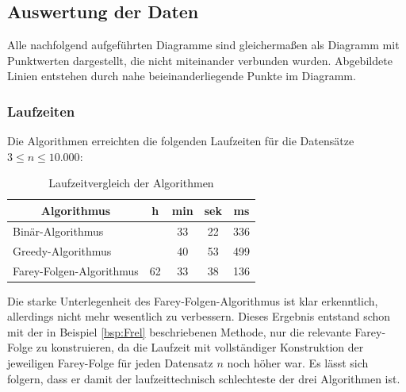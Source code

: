 \subsection{Auswertung der Daten}
Alle nachfolgend aufgeführten Diagramme sind gleichermaßen als Diagramm mit Punktwerten dargestellt, die nicht miteinander verbunden wurden. Abgebildete Linien entstehen durch nahe beieinanderliegende Punkte im Diagramm.


\subsubsection{Laufzeiten}
Die Algorithmen erreichten die folgenden Laufzeiten für die Datensätze $3 \leq n \leq 10.000$:\\
\begin{table}[H]
	\centering
	\begin{tabular}{|l | c c c c|}
		\hline
		\multicolumn{1}{|c|}{\textbf{Algorithmus}} & h & min & sek & ms \\ \hline
		Binär-Algorithmus & & 33 & 22 & 336 \\ \hline
		Greedy-Algorithmus & & 40 &  53 & 499 \\ \hline
		Farey-Folgen-Algorithmus & 62 & 33 & 38 & 136 \\ \hline
	\end{tabular}
	\caption{Laufzeitvergleich der Algorithmen}
	\label{table:LaufzeitVgl}
\end{table}
Die starke Unterlegenheit des Farey-Folgen-Algorithmus ist klar erkenntlich, allerdings nicht mehr wesentlich zu verbessern. Dieses Ergebnis entstand schon mit der in Beispiel \ref{bsp:Frel} beschriebenen Methode, nur die relevante Farey-Folge zu konstruieren, da die Laufzeit mit vollständiger Konstruktion der jeweiligen Farey-Folge für jeden Datensatz $n$ noch höher war. Es lässt sich folgern, dass er damit der laufzeittechnisch schlechteste der drei Algorithmen ist.


